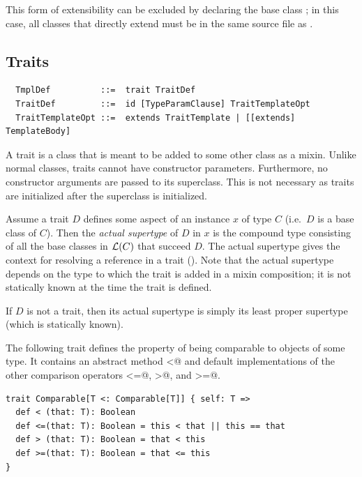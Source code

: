 This form of extensibility can be excluded by declaring the base class
 ; in this case, all classes that
directly extend  must be in the same source file as
.

\subsection{Traits}
\label{sec:traits}

\syntax\begin{lstlisting}
  TmplDef          ::=  trait TraitDef
  TraitDef         ::=  id [TypeParamClause] TraitTemplateOpt
  TraitTemplateOpt ::=  extends TraitTemplate | [[extends] TemplateBody]
\end{lstlisting}

A trait is a class that is meant to be added to some other class
as a mixin. Unlike normal classes, traits cannot have
constructor parameters. Furthermore, no constructor arguments are
passed to its superclass. This is not necessary as traits are
initialized after the superclass is initialized.

Assume a trait $D$ defines some aspect of an instance $x$ of
type $C$ (i.e.\ $D$ is a base class of $C$). Then the {\em actual
supertype} of $D$ in $x$ is the compound type consisting of all the
base classes in ${\cal L}(C)$ that succeed $D$.  The actual supertype gives
the context for resolving a  reference in a trait
(). Note that the actual supertype depends 
on the type to which the trait is added in a mixin composition; it is not
statically known at the time the trait is defined.

If $D$ is not a trait, then its actual supertype is simply its
least proper supertype (which is statically known).

\example\label{ex:comparable} The following trait defines the property
of being comparable to objects of some type. It contains an abstract
method \lstinline@<@ and default implementations of the other
comparison operators \lstinline@<=@, \lstinline@>@, and
\lstinline@>=@. 

\begin{lstlisting}
trait Comparable[T <: Comparable[T]] { self: T =>
  def < (that: T): Boolean
  def <=(that: T): Boolean = this < that || this == that
  def > (that: T): Boolean = that < this 
  def >=(that: T): Boolean = that <= this
}
\end{lstlisting}

